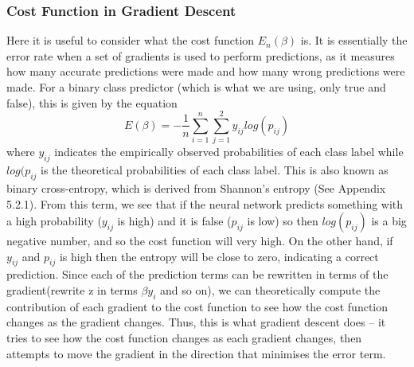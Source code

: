 \documentclass{article}
\begin{document}
\subsubsection{Cost Function in Gradient Descent}
Here it is useful to consider what the cost function ${E_n}(\beta)$ is. It is essentially the error rate when a set of gradients is used to perform predictions, as it measures how many accurate predictions were made and how many wrong predictions were made. For a binary class predictor (which is what we are using, only true and false), this is given by the equation
\begin{equation}
E(\beta) = - \frac{1}{n}\sum_{i=1}^{n}{\sum_{j=1}^{2}y_{ij}log(p_{ij})}
\end{equation} 
where $y_{ij}$ indicates the empirically observed probabilities of each class label while $log(p_{ij}$ is the theoretical probabilities of each class label. This is also known as binary cross-entropy, which is derived from Shannon's entropy (See Appendix 5.2.1). From this term, we see that if the neural network predicts something with a high probability ($y_{ij}$ is high) and it is false ($p_{ij}$ is low) so then $log(p_{ij})$ is a big negative number, and so the cost function will very high. On the other hand, if $y_{ij}$ and $p_{ij}$ is high then the entropy will be close to zero, indicating a correct prediction. Since each of the prediction terms can be rewritten in terms of the gradient(rewrite z in terms $\beta y_i $ and so on), we can theoretically compute the contribution of each gradient to the cost function to see how the cost function changes as the gradient changes. Thus, this is what gradient descent does -- it tries to see how the cost function changes as each gradient changes, then attempts to move the gradient in the direction that minimises the error term.
\end{document}
